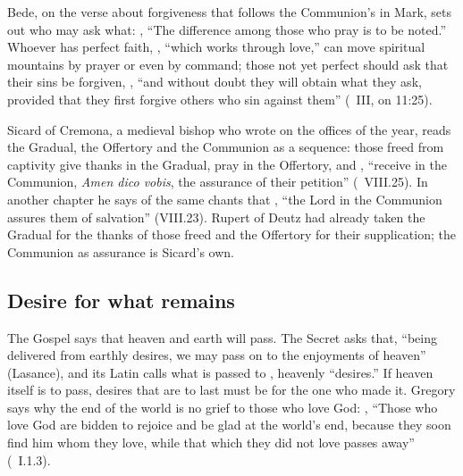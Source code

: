Bede, on the verse about forgiveness that follows the Communion's in Mark,
sets out who may ask what: , ``The
difference among those
who pray is to be noted.'' Whoever has perfect faith, , ``which works through love,'' can move spiritual
mountains by prayer or even by command; those not yet perfect should ask that
their sins be forgiven, , ``and without doubt they
will obtain what they ask, provided that they first forgive others who sin
against them'' (~III, on 11:25).

Sicard of Cremona, a medieval bishop who wrote on the offices of the year,
reads the Gradual, the Offertory and the Communion as a sequence: those
freed from captivity give thanks in the Gradual, pray in the Offertory, and
, ``receive in the
Communion, \emph{Amen dico vobis}, the assurance of their petition''
(~VIII.25). In another chapter he says of the same chants that
, ``the Lord in the
Communion assures them of salvation'' (VIII.23). Rupert of Deutz had already
taken the Gradual for the thanks of those freed and the Offertory for their
supplication; the Communion as assurance is Sicard's own.

\subsection{Desire for what remains}
\label{sec:words-secret}

The Gospel says that heaven and earth will pass. The Secret asks that,
``being delivered from earthly desires, we may pass on to the enjoyments of
heaven'' (Lasance), and its Latin calls what is passed to , heavenly ``desires.'' If heaven itself is to pass, desires that
are to last must be for the one who made it. Gregory says why the end of the
world is no grief to those who love God:
, ``Those who love God are bidden to rejoice and
be glad at the world's end, because they soon find him whom they love, while
that which they did not love passes away'' (~I.1.3).

